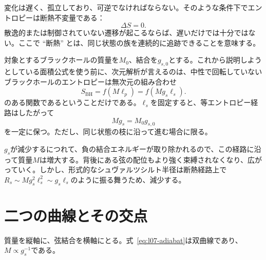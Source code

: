 変化は遅く、孤立しており、可逆でなければならない。そのような条件下でエントロピーは断熱不変量である：
\begin{equation}
\Delta S=0.
\label{eq:l07-adiabatic}
\end{equation}
散逸的または制御されていない遷移が起こるならば、遅いだけでは十分ではない。ここで ``断熱'' とは、同じ状態の族を連続的に追跡できることを意味する。

対象とするブラックホールの質量を\(M_0\)、結合を\(g_{s,0}\)とする。これから説明しようとしている面積公式を使う前に、次元解析が言えるのは、中性で回転していないブラックホールのエントロピーは無次元の組み合わせ
\begin{equation}
S_{\mathrm{BH}}=f(M\ell_p)
=f(Mg_s\ell_s).
\label{eq:l07-entropy-function}
\end{equation}
のある関数であるということだけである。\(\ell_s\)を固定すると、等エントロピー経路はしたがって
\begin{equation}
Mg_s=M_0g_{s,0}
\label{eq:l07-adiabat}
\end{equation}
を一定に保つ。ただし、同じ状態の枝に沿って進む場合に限る。

\(g_s\)が減少するにつれて、負の結合エネルギーが取り除かれるので、この経路に沿って質量\(M\)は増大する。背後にある弦の配位もより強く束縛されなくなり、広がっていく。しかし、形式的なシュヴァルツシルト半径は断熱経路上で\(R_s\sim Mg_s^2\ell_s^2\sim g_s\ell_s\)のように振る舞うため、減少する。

\begin{classroomqa}
\end{classroomqa}

\section{二つの曲線とその交点}

質量を縦軸に、弦結合を横軸にとる。式~\eqref{eq:l07-adiabat}は双曲線であり、\(M\propto g_s^{-1}\)である。

